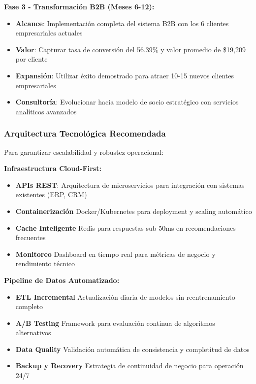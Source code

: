 \documentclass[twocolumn]{article}
\begin{document}
\textbf{Fase 3 - Transformación B2B (Meses 6-12):}
\begin{itemize}
    \item \textbf{Alcance}: Implementación completa del sistema B2B con los 6 clientes empresariales actuales
    \item \textbf{Valor}: Capturar tasa de conversión del 56.39\% y valor promedio de \$19,209 por cliente
    \item \textbf{Expansión}: Utilizar éxito demostrado para atraer 10-15 nuevos clientes empresariales
    \item \textbf{Consultoría}: Evolucionar hacia modelo de socio estratégico con servicios analíticos avanzados
\end{itemize}

\subsubsection{Arquitectura Tecnológica Recomendada}

Para garantizar escalabilidad y robustez operacional:

\textbf{Infraestructura Cloud-First:}
\begin{itemize}
    \item \textbf{APIs REST}: Arquitectura de microservicios para integración con sistemas existentes (ERP, CRM)
    \item \textbf{Containerización} Docker/Kubernetes para deployment y scaling automático
    \item \textbf{Cache Inteligente} Redis para respuestas sub-50ms en recomendaciones frecuentes
    \item \textbf{Monitoreo} Dashboard en tiempo real para métricas de negocio y rendimiento técnico
\end{itemize}

\textbf{Pipeline de Datos Automatizado:}
\begin{itemize}
    \item \textbf{ETL Incremental} Actualización diaria de modelos sin reentrenamiento completo
    \item \textbf{A/B Testing} Framework para evaluación continua de algoritmos alternativos
    \item \textbf{Data Quality} Validación automática de consistencia y completitud de datos
    \item \textbf{Backup y Recovery} Estrategia de continuidad de negocio para operación 24/7
\end{itemize}
\end{document}
